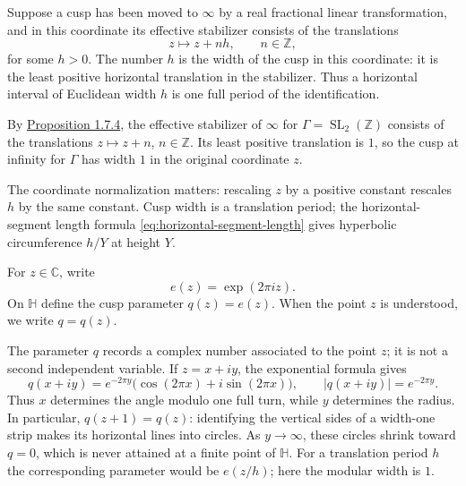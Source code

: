 \begin{definition}\label{modular.cusp-width}
Suppose a cusp has been moved to $\infty$ by a real fractional linear transformation, and in this coordinate its effective stabilizer consists of the translations
\[
 z\longmapsto z+nh,\qquad n\in\mathbb Z,
\]
for some $h>0$. The number $h$ is the width of the cusp in this coordinate: it is the least positive horizontal translation in the stabilizer. Thus a horizontal interval of Euclidean width $h$ is one full period of the identification.
\end{definition}

\begin{remark}\label{modular.cusp-width-one}
By \hyperref[modular.cusp-stabilizer]{Proposition 1.7.4}, the effective stabilizer of $\infty$ for $\Gamma=\operatorname{SL}_2(\mathbb Z)$ consists of the translations $z\mapsto z+n$, $n\in\mathbb Z$. Its least positive translation is $1$, so the cusp at infinity for $\Gamma$ has width $1$ in the original coordinate $z$.
\end{remark}

The coordinate normalization matters: rescaling $z$ by a positive constant rescales $h$ by the same constant. Cusp width is a translation period; the horizontal-segment length formula \eqref{eq:horizontal-segment-length} gives hyperbolic circumference $h/Y$ at height $Y$.

\begin{definition}\label{modular.cusp-parameter}
For $z\in\mathbb C$, write
\[
 e(z)=\exp(2\pi iz).
\]
On $\mathbb H$ define the cusp parameter $q(z)=e(z)$. When the point $z$ is understood, we write $q=q(z)$.
\end{definition}

The parameter $q$ records a complex number associated to the point $z$; it is not a second independent variable. If $z=x+iy$, the exponential formula gives
\begin{equation}\label{eq:cusp-parameter-polar}
 q(x+iy)=e^{-2\pi y}\bigl(\cos(2\pi x)+i\sin(2\pi x)\bigr),
 \qquad |q(x+iy)|=e^{-2\pi y}.
\end{equation}
Thus $x$ determines the angle modulo one full turn, while $y$ determines the radius. In particular, $q(z+1)=q(z)$: identifying the vertical sides of a width-one strip makes its horizontal lines into circles. As $y\to\infty$, these circles shrink toward $q=0$, which is never attained at a finite point of $\mathbb H$. For a translation period $h$ the corresponding parameter would be $e(z/h)$; here the modular width is $1$.

